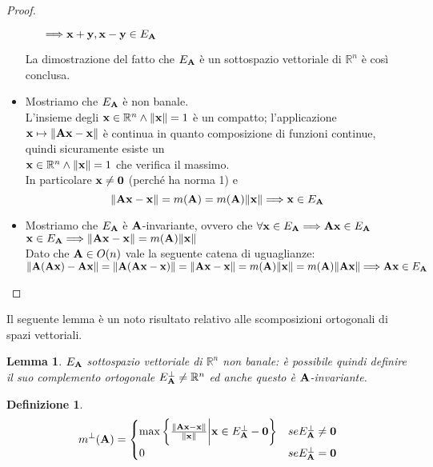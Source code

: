 \documentclass[a4paper,11pt,openright,twoside	]{book}
\newtheorem{definition}{Definizione}[section]
\newtheorem{lemma}[theorem]{Lemma}
\begin{document}
\begin{proof}
\begin{itemize}
\begin{itemize}
$\Longrightarrow \vb{x+y, x-y} \in E_{\vb{A}} $ 
\end{itemize}  
La dimostrazione del fatto che $E_{\vb{A}}$ è un sottospazio vettoriale di $\mathbb{R}^n $ è così conclusa.
\item Mostriamo che $E_{\vb{A}}$ è non banale.\\
L'insieme degli $\vb{x} \in \mathbb{R}^{n} \land \norm{\vb{x}} = 1$ è un compatto; l'applicazione $ \vb{x} \mapsto \norm{\vb{Ax-x}}$ è continua in quanto composizione di funzioni continue, quindi sicuramente esiste un \\ $\vb{x} \in \mathbb{R}^{n} \land \norm{\vb{x}} = 1$  che  verifica il massimo. \\
In particolare $\vb{x} \neq \vb{0}$  (perché ha norma 1) e 
\[ \norm{\vb{Ax - x}} = m(\vb{A}) = m(\vb{A})\norm{\vb{x}} \Longrightarrow \vb{x} \in E_{\vb{A}}\]
\item Mostriamo che $E_{\vb{A}}$ è $\vb{A}$-invariante, ovvero che  $\forall \vb{x} \in E_{\vb{A}} \Longrightarrow \vb{Ax} \in E_{\vb{A}}$ \\
$\vb{x} \in E_{\vb{A}} \Longrightarrow \norm{\vb{Ax-x}} = m(\vb{A})\norm{\vb{x}} $ \\
Dato che $\vb{A} \in O(n)$ vale la seguente catena di uguaglianze:\\
$ \norm{\vb{A(Ax) - Ax }} =  \norm{\vb{A(Ax-x)}} = \norm{\vb{Ax - x}} = m(\vb{A})\norm{\vb{x}} = m(\vb{A})\norm{\vb{Ax}} \Longrightarrow \vb{Ax} \in E_{\vb{A}}$
\end{itemize} 
\end{proof}
Il seguente lemma è un noto risultato relativo alle scomposizioni ortogonali di spazi vettoriali. 
\begin{lemma}
$E_{\vb{A}}$ sottospazio vettoriale di $\mathbb{R}^n $ non banale: è possibile quindi definire il suo complemento ortogonale $E^{\perp}_{\vb{A}} \neq \mathbb{R}^n$ ed anche questo è $\vb{A}$-invariante. 
\end{lemma} 

\begin{definition}

\[ m^{\perp}(\vb{A}) = \begin{cases} 
      \max \bigg\{ \frac{\norm{\vb{Ax-x}}}{\norm{\vb{x}}} \bigg|  \vb{x} \in E^{\perp}_{\vb{A}} - \vb{0} \bigg\}  &  se   E^{\perp}_{\vb{A}} \neq {\vb{0}} \\
      0 & se   E^{\perp}_{\vb{A}} = {\vb{0}} \\
      
   \end{cases}
\]

\end{definition}
\end{document}
